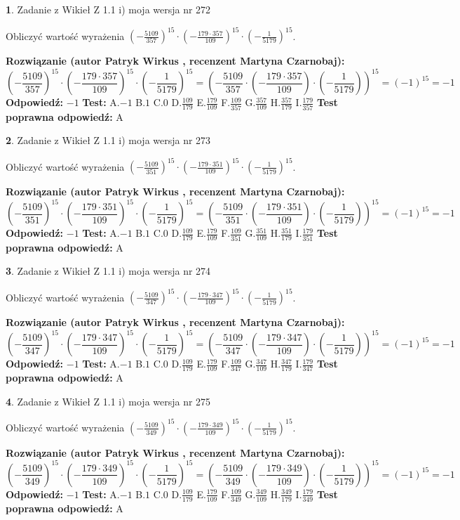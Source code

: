 \documentclass[12pt, a4paper]{article}
\theoremstyle{definition} %
\newtheorem{zad}{}
\newcommand{\zadStart}[1]{\begin{zad}#1\newline}
\newcommand{\zadStop}{\end{zad}}
\newcommand{\rozwStart}[2]{\noindent \textbf{Rozwiązanie (autor #1 , recenzent #2): }\newline}
\newcommand{\rozwStop}{\newline}
\newcommand{\odpStart}{\noindent \textbf{Odpowiedź:}\newline}
\newcommand{\odpStop}{\newline}
\newcommand{\testStart}{\noindent \textbf{Test:}\newline}
\newcommand{\testStop}{\newline}
\newcommand{\kluczStart}{\noindent \textbf{Test poprawna odpowiedź:}\newline}
\newcommand{\kluczStop}{\newline}
\begin{document}
\zadStart{Zadanie z Wikieł Z 1.1 i) moja wersja nr 272}

Obliczyć wartość wyrażenia $(-\frac{5109}{357})^{15} \cdot (-\frac{179 \cdot 357}{109})^{15} \cdot (-\frac{1}{5179})^{15}$.
\zadStop
\rozwStart{Patryk Wirkus}{Martyna Czarnobaj}
$$(-\frac{5109}{357})^{15} \cdot (-\frac{179 \cdot 357}{109})^{15} \cdot (-\frac{1}{5179})^{15} = (-\frac{5109}{357} \cdot (-\frac{179 \cdot 357}{109}) \cdot (-\frac{1}{5179}))^{15} = (-1)^{15} = -1$$
\rozwStop
\odpStart
$-1$
\odpStop
\testStart
A.$-1$ B.$1$ C.$0$ D.$\frac{109}{179}$ E.$\frac{179}{109}$
F.$\frac{109}{357}$ G.$\frac{357}{109}$
H.$\frac{357}{179}$
I.$\frac{179}{357}$
\testStop
\kluczStart
A
\kluczStop



\zadStart{Zadanie z Wikieł Z 1.1 i) moja wersja nr 273}

Obliczyć wartość wyrażenia $(-\frac{5109}{351})^{15} \cdot (-\frac{179 \cdot 351}{109})^{15} \cdot (-\frac{1}{5179})^{15}$.
\zadStop
\rozwStart{Patryk Wirkus}{Martyna Czarnobaj}
$$(-\frac{5109}{351})^{15} \cdot (-\frac{179 \cdot 351}{109})^{15} \cdot (-\frac{1}{5179})^{15} = (-\frac{5109}{351} \cdot (-\frac{179 \cdot 351}{109}) \cdot (-\frac{1}{5179}))^{15} = (-1)^{15} = -1$$
\rozwStop
\odpStart
$-1$
\odpStop
\testStart
A.$-1$ B.$1$ C.$0$ D.$\frac{109}{179}$ E.$\frac{179}{109}$
F.$\frac{109}{351}$ G.$\frac{351}{109}$
H.$\frac{351}{179}$
I.$\frac{179}{351}$
\testStop
\kluczStart
A
\kluczStop



\zadStart{Zadanie z Wikieł Z 1.1 i) moja wersja nr 274}

Obliczyć wartość wyrażenia $(-\frac{5109}{347})^{15} \cdot (-\frac{179 \cdot 347}{109})^{15} \cdot (-\frac{1}{5179})^{15}$.
\zadStop
\rozwStart{Patryk Wirkus}{Martyna Czarnobaj}
$$(-\frac{5109}{347})^{15} \cdot (-\frac{179 \cdot 347}{109})^{15} \cdot (-\frac{1}{5179})^{15} = (-\frac{5109}{347} \cdot (-\frac{179 \cdot 347}{109}) \cdot (-\frac{1}{5179}))^{15} = (-1)^{15} = -1$$
\rozwStop
\odpStart
$-1$
\odpStop
\testStart
A.$-1$ B.$1$ C.$0$ D.$\frac{109}{179}$ E.$\frac{179}{109}$
F.$\frac{109}{347}$ G.$\frac{347}{109}$
H.$\frac{347}{179}$
I.$\frac{179}{347}$
\testStop
\kluczStart
A
\kluczStop



\zadStart{Zadanie z Wikieł Z 1.1 i) moja wersja nr 275}

Obliczyć wartość wyrażenia $(-\frac{5109}{349})^{15} \cdot (-\frac{179 \cdot 349}{109})^{15} \cdot (-\frac{1}{5179})^{15}$.
\zadStop
\rozwStart{Patryk Wirkus}{Martyna Czarnobaj}
$$(-\frac{5109}{349})^{15} \cdot (-\frac{179 \cdot 349}{109})^{15} \cdot (-\frac{1}{5179})^{15} = (-\frac{5109}{349} \cdot (-\frac{179 \cdot 349}{109}) \cdot (-\frac{1}{5179}))^{15} = (-1)^{15} = -1$$
\rozwStop
\odpStart
$-1$
\odpStop
\testStart
A.$-1$ B.$1$ C.$0$ D.$\frac{109}{179}$ E.$\frac{179}{109}$
F.$\frac{109}{349}$ G.$\frac{349}{109}$
H.$\frac{349}{179}$
I.$\frac{179}{349}$
\testStop
\kluczStart
A
\kluczStop
\end{document}
